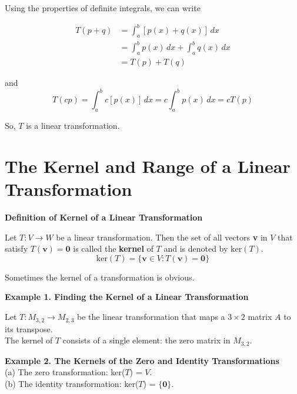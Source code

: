 \documentclass{article}
\newcounter{Def}[section]
\begin{document}
    Using the properties of definite integrals, we can write

    \begin{minipage}{0.45\linewidth}
    \begin{equation*}
        \begin{split}
            T(p + q) &= \int_a^b [p(x) + q(x)]\,dx \\
                     &= \int_a^b p(x)\,dx + \int_a^b q(x)\,dx \\
                     &= T(p) + T(q)
        \end{split}
    \end{equation*}    
    \end{minipage} \hfill \vline \hfill
    \begin{minipage}{0.50\linewidth}
        and
        \[T(cp) = \int_a^b c[p(x)]\,dx = c\int_a^b p(x)\,dx = cT(p)\]
    \end{minipage}

    So, $T$ is a linear transformation.

    \pagebreak
    \part{The Kernel and Range of a Linear Transformation}
    \begin{tcolorbox}[colback = {blue9}]
         \textbf{Definition of Kernel of a Linear Transformation}

        Let $T: V \to W$ be a linear transformation. Then the set of all vectors \textbf{v} in $V$ that satisfy $T( \textbf{v} ) = \textbf{0} $
        is called the \textbf{kernel} of $T$ and is denoted by $\text{ker}(T)$.
        \[\text{ker}(T) = \{ \textbf{v} \in V : T( \textbf{v} ) = \textbf{0} \} \]
    \end{tcolorbox}
    Sometimes the kernel of a transformation is obvious.

    \textbf{Example 1. \textcolor{blue5}{Finding the Kernel of a Linear Transformation}}

    Let $T: M_{3,2} \to M_{2,3}$ be the linear transformation that maps a $3 \times 2$ matrix $A$ to its transpose.\\
    The kernel of $T$ consists of a single element: the zero matrix in $M_{3,2}$.

    \textbf{Example 2. \textcolor{blue5}{The Kernels of the Zero and Identity Transformations}}\\
    (a) The zero transformation: ker($T$) = $V$.\\
    (b) The identity transformation: ker($T$) = $\{ \textbf{0} \}$.
\end{document}
